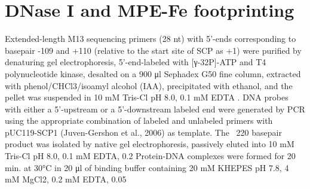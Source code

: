 \section{DNase I and MPE-Fe footprinting}
Extended-length M13 sequencing primers (28 nt) with 5’-ends corresponding to basepair -109 and +110 (relative to the start site of SCP as +1) were purified by denaturing gel electrophoresis, 5’-end-labeled with [γ-32P]-ATP and T4 polynucleotide kinase, desalted on a 900 μl Sephadex G50 fine column, extracted with phenol/CHCl3/isoamyl alcohol (IAA), precipitated with ethanol, and the pellet was suspended in 10 mM Tris-Cl pH 8.0, 0.1 mM EDTA .  DNA probes with either a 5’-upstream or a 5’-downstream labeled end were generated by PCR using the appropriate combination of labeled and unlabeled primers with pUC119-SCP1 (Juven-Gershon et al., 2006) as template.  The ~220 basepair product was isolated by native gel electrophoresis, passively eluted into 10 mM Tris-Cl pH 8.0, 0.1 mM EDTA, 0.2%
	Protein-DNA complexes were formed for 20 min. at 30°C in 20 μl of binding buffer containing 20 mM KHEPES pH 7.8, 4 mM MgCl2, 0.2 mM EDTA, 0.05%
